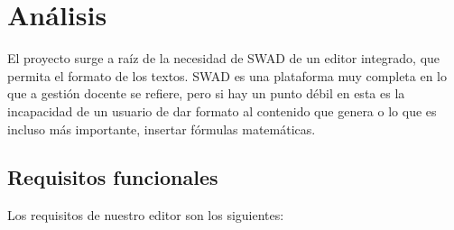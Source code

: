 \chapter{Análisis}

El proyecto surge  a raíz de la necesidad de SWAD de un editor integrado, que permita el formato de los textos. SWAD es una plataforma muy completa en lo que a gestión docente se refiere, pero si hay un punto débil en esta es la incapacidad de un usuario de dar formato al contenido que genera o lo que es incluso más importante, insertar fórmulas matemáticas. 

\section{Requisitos funcionales}

Los requisitos de nuestro editor son los siguientes:

